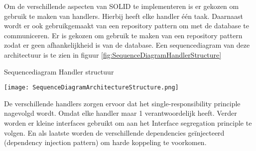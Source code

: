 \whitespace
Om de verschillende aspecten van SOLID te implementeren is er gekozen om gebruik te maken van handlers.
Hierbij heeft elke handler één taak.
Daarnaast wordt er ook gebruikgemaakt van een repository pattern om met de database te communiceren.
Er is gekozen om gebruik te maken van een repository pattern zodat er geen afhankelijkheid is van de database.
Een sequencediagram van deze architectuur is te zien in figuur \ref{fig:SequenceDiagramHandlerStructure}

\whitespace
\begin{graphic}
    \captionsetup{type=figure}
    \caption{Sequencediagram Handler structuur}
    \texttt{[image: SequenceDiagramArchitectureStructure.png]}
    \label{fig:SequenceDiagramHandlerStructure}
\end{graphic}

\whitespace
De verschillende handlers zorgen ervoor dat het single-responsibility principle nagevolgd wordt.
Omdat elke handler maar 1 verantwoordelijk heeft.
Verder worden er kleine interfaces gebruikt om aan het Interface segregation principle te volgen.
En als laatste worden de verschillende dependencies geïnjecteerd (dependency injection pattern) om harde koppeling te voorkomen.
